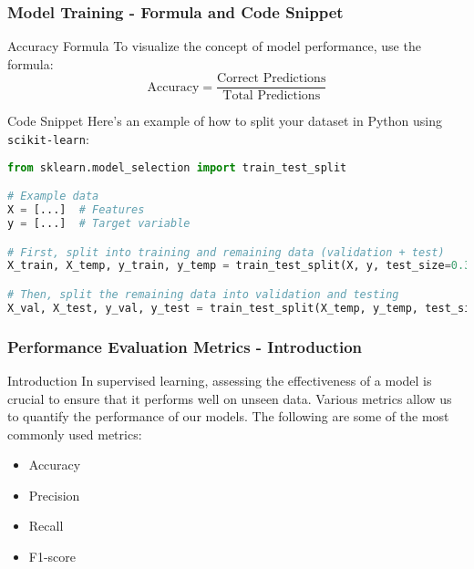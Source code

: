 \documentclass[aspectratio=169]{beamer}
\begin{document}
\begin{frame}[fragile]
    \frametitle{Model Training - Formula and Code Snippet}
    
    \begin{block}{Accuracy Formula}
    To visualize the concept of model performance, use the formula:
    \begin{equation}
    \text{Accuracy} = \frac{\text{Correct Predictions}}{\text{Total Predictions}}
    \end{equation}
    \end{block}
    
    \begin{block}{Code Snippet}
    Here’s an example of how to split your dataset in Python using \texttt{scikit-learn}:
    \begin{lstlisting}[language=Python]
from sklearn.model_selection import train_test_split

# Example data
X = [...]  # Features
y = [...]  # Target variable

# First, split into training and remaining data (validation + test)
X_train, X_temp, y_train, y_temp = train_test_split(X, y, test_size=0.3, random_state=42)

# Then, split the remaining data into validation and testing
X_val, X_test, y_val, y_test = train_test_split(X_temp, y_temp, test_size=0.5, random_state=42)
    \end{lstlisting}
    \end{block}
\end{frame}

\begin{frame}[fragile]
    \frametitle{Performance Evaluation Metrics - Introduction}
    \begin{block}{Introduction}
        In supervised learning, assessing the effectiveness of a model is crucial to ensure that it performs well on unseen data. Various metrics allow us to quantify the performance of our models. The following are some of the most commonly used metrics:
    \end{block}
    \begin{itemize}
        \item Accuracy
        \item Precision
        \item Recall
        \item F1-score
    \end{itemize}
\end{frame}
\end{document}
